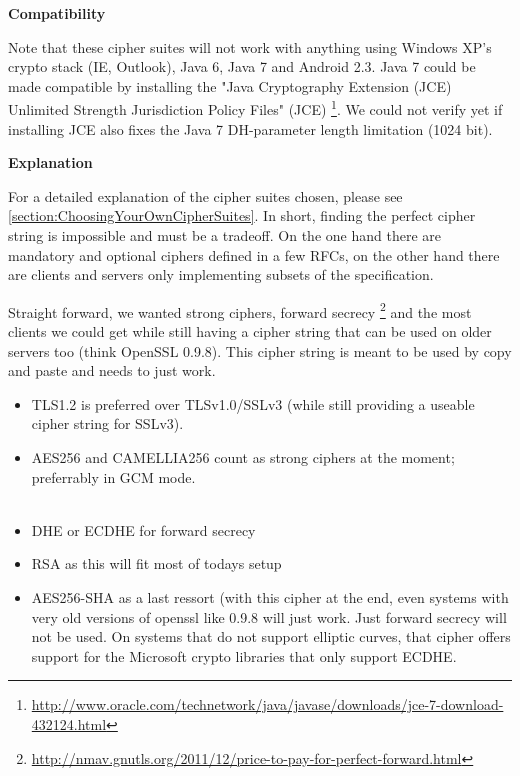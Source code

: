 \textbf{Compatibility}

Note that these cipher suites will not work with anything using Windows XP's
crypto stack (IE, Outlook), Java 6, Java 7 and Android 2.3. Java 7 could be
made compatible by installing the "Java Cryptography Extension (JCE) Unlimited
Strength Jurisdiction Policy Files"
(JCE) \footnote{\url{http://www.oracle.com/technetwork/java/javase/downloads/jce-7-download-432124.html}}.
We could not verify yet if installing JCE also fixes the Java 7
DH-parameter length limitation (1024 bit). 

\textbf{Explanation}

For a detailed explanation of the cipher suites chosen, please see
\ref{section:ChoosingYourOwnCipherSuites}. In short, finding the perfect cipher
string is impossible and must be a tradeoff. On the one hand
there are mandatory and optional ciphers defined in a few RFCs, on the other hand
there are clients and servers only implementing subsets of the specification.

Straight forward, we wanted strong ciphers, forward secrecy
\footnote{\url{http://nmav.gnutls.org/2011/12/price-to-pay-for-perfect-forward.html}}
and the most clients we could get while still having a cipher string that can be
used on older servers too (think OpenSSL 0.9.8). This cipher string is meant to be used
by copy and paste and needs to just work.

\begin{itemize}
\item TLS1.2 is preferred over TLSv1.0/SSLv3 (while still providing a useable cipher
      string for SSLv3).
\item AES256 and CAMELLIA256 count as strong ciphers at the moment; preferrably in
      GCM mode.\\
       \\
\item DHE or ECDHE for forward secrecy
\item RSA as this will fit most of todays setup
\item AES256-SHA as a last ressort (with this cipher at the end, even systems with
      very old versions of openssl like 0.9.8 will just work. Just forward secrecy
      will not be used. On systems that do not support elliptic curves, that cipher
      offers support for the Microsoft crypto libraries that only support ECDHE.
\end{itemize}



